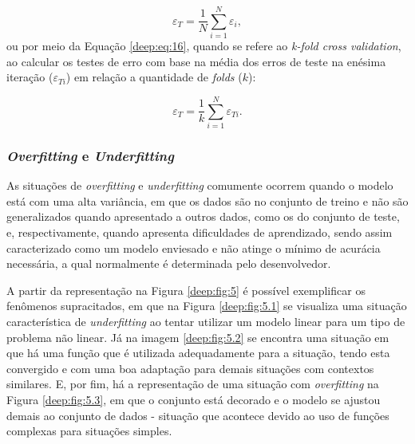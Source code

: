 \begin{equation}
    \label{deep:eq:15}
    \varepsilon_T = \frac{1}{N} \sum_{i=1}^{N} \varepsilon_i,
\end{equation}
ou por meio da Equação \ref{deep:eq:16}, quando se refere ao \textit{k-fold cross validation}, ao calcular os testes de erro com base na média dos erros de teste na enésima iteração ($\varepsilon_{Ti}$) em relação a quantidade de \textit{folds} ($k$):

\begin{equation}
    \label{deep:eq:16}
    \varepsilon_T = \frac{1}{k} \sum_{i=1}^{N} \varepsilon_{Ti}.
\end{equation}

\subsubsection{\textit{Overfitting} e \textit{Underfitting}}
\label{deep:overunder}

As situações de \textit{overfitting} e \textit{underfitting} comumente ocorrem quando o modelo está com uma alta variância, em que os dados são  no conjunto de treino e não são generalizados quando apresentado a outros dados, como os do conjunto de teste, e, respectivamente, quando apresenta dificuldades de aprendizado, sendo assim caracterizado como um modelo enviesado e não atinge o mínimo de acurácia necessária, a qual normalmente é determinada pelo desenvolvedor.

A partir da representação na Figura \ref{deep:fig:5} é possível exemplificar os fenômenos supracitados, em que na Figura \ref{deep:fig:5.1} se visualiza uma situação característica de \textit{underfitting} ao tentar utilizar um modelo linear para um tipo de problema não linear. Já na imagem \ref{deep:fig:5.2} se encontra uma situação em que há uma função que é utilizada adequadamente para a situação, tendo esta convergido e com uma boa adaptação para demais situações com contextos similares. E, por fim, há a representação de uma situação com \textit{overfitting} na Figura \ref{deep:fig:5.3}, em que o conjunto está decorado e o modelo se ajustou demais ao conjunto de dados - situação que acontece devido ao uso de funções complexas para situações simples.

